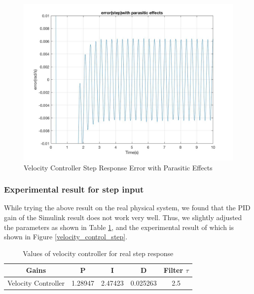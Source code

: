 \documentclass[letterpaper]{article}
\begin{document}
\begin{figure}[H]
\begin{center}
\includegraphics[width = 12cm]{Error(step)with_parasitic_effects.jpg}
\caption{Velocity Controller Step Response Error with Parasitic Effects}
\label{Error(step)with_parasitic_effects}
\end{center}
\end{figure}

\subsubsection*{Experimental result for step input}
While trying the above result on the real physical system, we found that the PID gain of the Simulink result does not work very well. Thus, we slightly adjusted the parameters as shown in Table \ref{velocityGains_step_real}, and the experimental result of which is shown in Figure \ref{velocity_control_step}.\\
\begin{table}[htb]
\begin{center}
    \begin{tabular}{|c|c|c|c|c|}
    \hline
        Gains & P   & I & D     & Filter $\tau$   \\ \hline
        Velocity Controller  & 1.28947 & 2.47423 & 0.025263 & 2.5  \\
    \hline
    \end{tabular}
\end{center}
\caption{Values of velocity controller for real step response}
\label{velocityGains_step_real}
\end{table}
\end{document}
